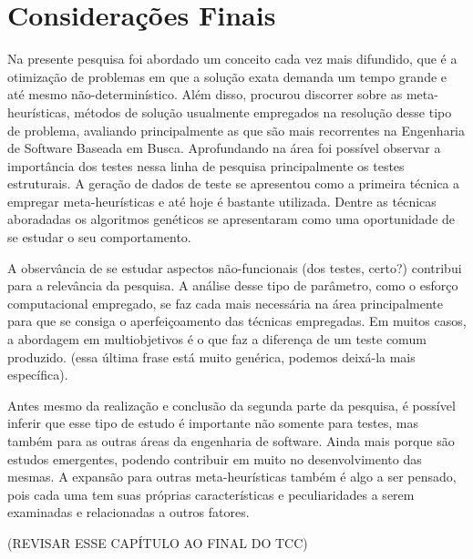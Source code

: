 \chapter[Considerações Finais]{Considerações Finais}
\label{conclusoes}

Na presente pesquisa foi abordado um conceito cada vez mais difundido, que é a otimização de problemas em que a solução exata demanda um tempo grande e até mesmo não-determinístico. Além disso, procurou discorrer sobre as meta-heurísticas, métodos de solução usualmente empregados na resolução desse tipo de problema, avaliando principalmente as que são mais recorrentes na Engenharia de Software Baseada em Busca. Aprofundando na área foi possível observar a importância dos testes nessa linha de pesquisa principalmente os testes estruturais. A geração de dados de teste se apresentou como a primeira técnica a empregar meta-heurísticas e até hoje é bastante utilizada. Dentre as técnicas aboradadas os algoritmos genéticos se apresentaram como uma oportunidade de se estudar o seu comportamento.

A observância de se estudar aspectos não-funcionais (dos testes, certo?) contribui para a relevância da pesquisa. A análise desse tipo de parâmetro, como o esforço computacional empregado, se faz cada mais necessária na área principalmente para que se consiga o aperfeiçoamento das técnicas empregadas. Em muitos casos, a abordagem em multiobjetivos é o que faz a diferença de um teste comum produzido. (essa última frase está muito genérica, podemos deixá-la mais específica).

Antes mesmo da realização e conclusão da segunda parte da pesquisa, é possível inferir que esse tipo de estudo é importante não somente para testes, mas também para as outras áreas da engenharia de software. Ainda mais porque são estudos emergentes, podendo contribuir em muito no desenvolvimento das mesmas. A expansão para outras meta-heurísticas também é algo a ser pensado, pois cada uma tem suas próprias características e peculiaridades a serem examinadas e relacionadas a outros fatores.

(REVISAR ESSE CAPÍTULO AO FINAL DO TCC)
